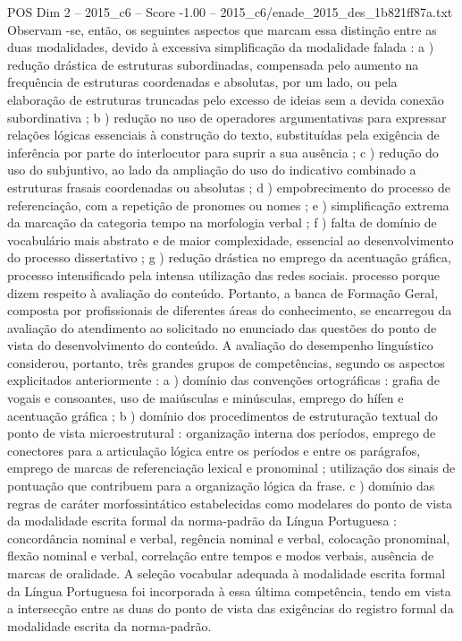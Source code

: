 \begin{textsample}{POS Dim 2 – 2015\_c6 – Score -1.00 – 2015\_c6/enade\_2015\_des\_1b821ff87a.txt}
Observam -se, então, os seguintes aspectos que marcam essa distinção entre as duas modalidades, devido à excessiva simplificação da modalidade falada : a ) redução drástica de estruturas subordinadas, compensada pelo aumento na frequência de estruturas coordenadas e absolutas, por um lado, ou pela elaboração de estruturas truncadas pelo excesso de ideias sem a devida conexão subordinativa ; b ) redução no uso de operadores argumentativas para expressar relações lógicas essenciais à construção do texto, substituídas pela exigência de inferência por parte do interlocutor para suprir a sua ausência ; c ) redução do uso do subjuntivo, ao lado da ampliação do uso do indicativo combinado a estruturas frasais coordenadas ou absolutas ; d ) empobrecimento do processo de referenciação, com a repetição de pronomes ou nomes ; e ) simplificação extrema da marcação da categoria tempo na morfologia verbal ; f ) falta de domínio de vocabulário mais abstrato e de maior complexidade, essencial ao desenvolvimento do processo dissertativo ; g ) redução drástica no emprego da acentuação gráfica, processo intensificado pela intensa utilização das redes sociais. processo porque dizem respeito à avaliação do conteúdo.
Portanto, a banca de Formação Geral, composta por profissionais de diferentes áreas do conhecimento, se encarregou da avaliação do atendimento ao solicitado no enunciado das questões do ponto de vista do desenvolvimento do conteúdo.
A avaliação do desempenho linguístico considerou, portanto, três grandes grupos de competências, segundo os aspectos explicitados anteriormente : a ) domínio das convenções ortográficas : grafia de vogais e consoantes, uso de maiúsculas e minúsculas, emprego do hífen e acentuação gráfica ; b ) domínio dos procedimentos de estruturação textual do ponto de vista microestrutural : organização interna dos períodos, emprego de conectores para a articulação lógica entre os períodos e entre os parágrafos, emprego de marcas de referenciação lexical e pronominal ; utilização dos sinais de pontuação que contribuem para a organização lógica da frase. c ) domínio das regras de caráter morfossintático estabelecidas como modelares do ponto de vista da modalidade escrita formal da norma-padrão da Língua Portuguesa : concordância nominal e verbal, regência nominal e verbal, colocação pronominal, flexão nominal e verbal, correlação entre tempos e modos verbais, ausência de marcas de oralidade.
A seleção vocabular adequada à modalidade escrita formal da Língua Portuguesa foi incorporada à essa última competência, tendo em vista a intersecção entre as duas do ponto de vista das exigências do registro formal da modalidade escrita da norma-padrão.

\end{textsample}
